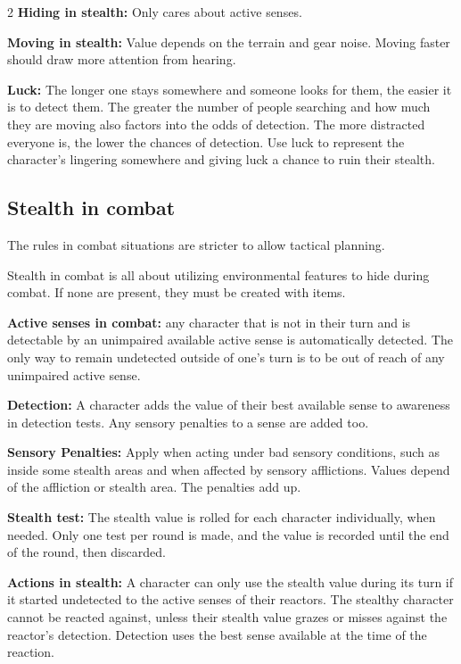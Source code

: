 \begin{multicols}{2}
\textbf{Hiding in stealth:} Only cares about active senses. 

\textbf{Moving in stealth:} Value depends on the terrain and gear noise. Moving faster should draw more attention from hearing.

\textbf{Luck:} The longer one stays somewhere and someone looks for them, the easier it is to detect them. The greater the number of people searching and how much they are moving also factors into the odds of detection. The more distracted everyone is, the lower the chances of detection. Use luck to represent the character's lingering somewhere and giving luck a chance to ruin their stealth.


\subsection{Stealth in combat}

The rules in combat situations are stricter to allow tactical planning. 

Stealth in combat is all about utilizing environmental features to hide during combat. If none are present, they must be created with items.

\textbf{Active senses in combat:} any character that is not in their turn and is detectable by an unimpaired available active sense is automatically detected. The only way to remain undetected outside of one's turn is to be out of reach of any unimpaired active sense.

\textbf{Detection:} A character adds the value of their best available sense to awareness in detection tests. Any sensory penalties to a sense are added too.

\textbf{Sensory Penalties:} Apply when acting under bad sensory conditions, such as inside some stealth areas and when affected by sensory afflictions. Values depend of the affliction or stealth area. The penalties add up.

\textbf{Stealth test:} The stealth value is rolled for each character individually, when needed. Only one test per round is made, and the value is recorded until the end of the round, then discarded.

\textbf{Actions in stealth:} A character can only use the stealth value during its turn if it started undetected to the active senses of their reactors. The stealthy character cannot be reacted against, unless their stealth value grazes or misses against the reactor's detection. Detection uses the best sense available at the time of the reaction.


\end{multicols}
